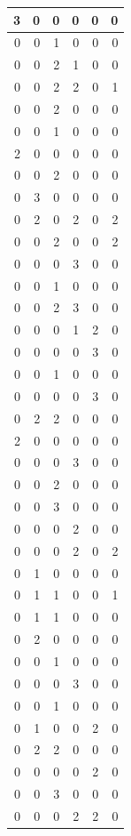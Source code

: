\documentclass[
  12pt,
]{krantz}
\begin{document}
\begin{tabular}{r|r|r|r|r|r}
\hline
3 & 0 & 0 & 0 & 0 & 0\\
\hline
0 & 0 & 1 & 0 & 0 & 0\\
\hline
0 & 0 & 2 & 1 & 0 & 0\\
\hline
0 & 0 & 2 & 2 & 0 & 1\\
\hline
0 & 0 & 2 & 0 & 0 & 0\\
\hline
0 & 0 & 1 & 0 & 0 & 0\\
\hline
2 & 0 & 0 & 0 & 0 & 0\\
\hline
0 & 0 & 2 & 0 & 0 & 0\\
\hline
0 & 3 & 0 & 0 & 0 & 0\\
\hline
0 & 2 & 0 & 2 & 0 & 2\\
\hline
0 & 0 & 2 & 0 & 0 & 2\\
\hline
0 & 0 & 0 & 3 & 0 & 0\\
\hline
0 & 0 & 1 & 0 & 0 & 0\\
\hline
0 & 0 & 2 & 3 & 0 & 0\\
\hline
0 & 0 & 0 & 1 & 2 & 0\\
\hline
0 & 0 & 0 & 0 & 3 & 0\\
\hline
0 & 0 & 1 & 0 & 0 & 0\\
\hline
0 & 0 & 0 & 0 & 3 & 0\\
\hline
0 & 2 & 2 & 0 & 0 & 0\\
\hline
2 & 0 & 0 & 0 & 0 & 0\\
\hline
0 & 0 & 0 & 3 & 0 & 0\\
\hline
0 & 0 & 2 & 0 & 0 & 0\\
\hline
0 & 0 & 3 & 0 & 0 & 0\\
\hline
0 & 0 & 0 & 2 & 0 & 0\\
\hline
0 & 0 & 0 & 2 & 0 & 2\\
\hline
0 & 1 & 0 & 0 & 0 & 0\\
\hline
0 & 1 & 1 & 0 & 0 & 1\\
\hline
0 & 1 & 1 & 0 & 0 & 0\\
\hline
0 & 2 & 0 & 0 & 0 & 0\\
\hline
0 & 0 & 1 & 0 & 0 & 0\\
\hline
0 & 0 & 0 & 3 & 0 & 0\\
\hline
0 & 0 & 1 & 0 & 0 & 0\\
\hline
0 & 1 & 0 & 0 & 2 & 0\\
\hline
0 & 2 & 2 & 0 & 0 & 0\\
\hline
0 & 0 & 0 & 0 & 2 & 0\\
\hline
0 & 0 & 3 & 0 & 0 & 0\\
\hline
0 & 0 & 0 & 2 & 2 & 0\\

\end{tabular}
\end{document}
